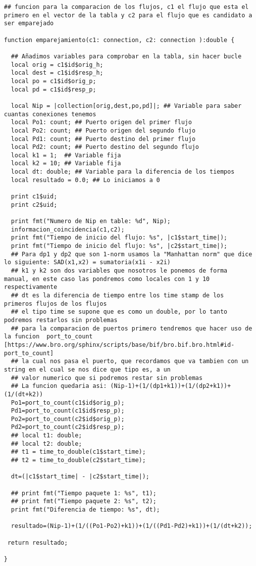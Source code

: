\begin{lstlisting}[style=CodigoC]
## funcion para la comparacion de los flujos, c1 el flujo que esta el primero en el vector de la tabla y c2 para el flujo que es candidato a ser emparejado

function emparejamiento(c1: connection, c2: connection ):double {

  ## Añadimos variables para comprobar en la tabla, sin hacer bucle
  local orig = c1$id$orig_h;
  local dest = c1$id$resp_h;
  local po = c1$id$orig_p;
  local pd = c1$id$resp_p;

  local Nip = |collection[orig,dest,po,pd]|; ## Variable para saber cuantas conexiones tenemos
  local Po1: count; ## Puerto origen del primer flujo
  local Po2: count; ## Puerto origen del segundo flujo
  local Pd1: count; ## Puerto destino del primer flujo
  local Pd2: count; ## Puerto destino del segundo flujo
  local k1 = 1;  ## Variable fija
  local k2 = 10; ## Variable fija
  local dt: double; ## Variable para la diferencia de los tiempos
  local resultado = 0.0; ## Lo iniciamos a 0
  
  print c1$uid;
  print c2$uid;

  print fmt("Numero de Nip en table: %d", Nip);
  informacion_coincidencia(c1,c2);
  print fmt("Tiempo de inicio del flujo: %s", |c1$start_time|);
  print fmt("Tiempo de inicio del flujo: %s", |c2$start_time|);
  ## Para dp1 y dp2 que son 1-norm usamos la "Manhattan norm" que dice lo siguiente: SAD(x1,x2) = sumatoria(x1i - x2i)
  ## k1 y k2 son dos variables que nosotros le ponemos de forma manual, en este caso las pondremos como locales con 1 y 10 respectivamente
  ## dt es la diferencia de tiempo entre los time stamp de los primeros flujos de los flujos
  ## el tipo time se supone que es como un double, por lo tanto podremos restarlos sin problemas
  ## para la comparacion de puertos primero tendremos que hacer uso de la funcion  port_to_count [https://www.bro.org/sphinx/scripts/base/bif/bro.bif.bro.html#id-port_to_count]
  ## la cual nos pasa el puerto, que recordamos que va tambien con un string en el cual se nos dice que tipo es, a un
  ## valor numerico que si podremos restar sin problemas
  ## La funcion quedaria asi: (Nip-1)+(1/(dp1+k1))+(1/(dp2+k1))+(1/(dt+k2))
  Po1=port_to_count(c1$id$orig_p);
  Pd1=port_to_count(c1$id$resp_p);
  Po2=port_to_count(c2$id$orig_p);
  Pd2=port_to_count(c2$id$resp_p);
  ## local t1: double;
  ## local t2: double;
  ## t1 = time_to_double(c1$start_time);
  ## t2 = time_to_double(c2$start_time);

  dt=(|c1$start_time| - |c2$start_time|);

  ## print fmt("Tiempo paquete 1: %s", t1);
  ## print fmt("Tiempo paquete 2: %s", t2);
  print fmt("Diferencia de tiempo: %s", dt);

  resultado=(Nip-1)+(1/((Po1-Po2)+k1))+(1/((Pd1-Pd2)+k1))+(1/(dt+k2));

 return resultado;

}
\end{lstlisting}


